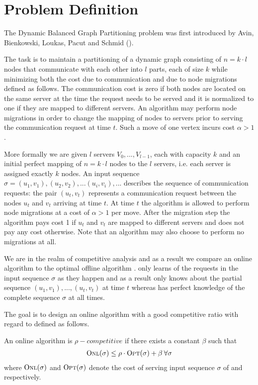 \documentclass[a4paper,xcolor=dvipsnames, tikz, 12pt]{article}
\newcommand{\opt}{\text{O{\scriptsize PT}}}
\newcommand{\onl}{\text{O{\scriptsize NL}}}
\theoremstyle{definition}
\begin{document}
	
	\section{Problem Definition}
	
	The Dynamic Balanced Graph Partitioning problem was first introduced by Avin, Bienkowski, Loukas, Pacut and Schmid (\cite{Avin2015}).
	
	The task is to maintain a partitioning of a dynamic graph consisting of $n=k\cdot l$ nodes that communicate with each other into $l$ parts, each of size $k$ while minimizing both the cost due to communication and due to node migrations defined as follows. The communication cost is zero if both nodes are located on the same server at the time the request needs to be served and it is normalized to one if they are mapped to different servers. An algorithm may perform node migrations in order to change the mapping of nodes to servers prior to serving the communication request at time $t$. Such a move of one vertex incurs cost $\alpha>1$.
	
	More formally we are given $l$ servers $V_0,...,V_{l-1}$, each with capacity $k$ and an initial perfect mapping of $n=k\cdot l$ nodes to the $l$ servers, i.e. each server is assigned exactly $k$ nodes. An input sequence $\sigma=(u_1, v_1), (u_2, v_2),...(u_i,v_i),...$ describes the sequence of communication requests: the pair $(u_t, v_t)$ represents a communication request between the nodes $u_t$ and $v_t$ arriving at time $t$. At time $t$ the algorithm is allowed to perform node migrations at a cost of $\alpha>1$ per move. After the migration step the algorithm pays cost 1 if $u_t$ and $v_t$ are mapped to different servers and does not pay any cost otherwise. Note that an algorithm may also choose to perform no migrations at all.
	
	We are in the realm of competitive analysis and as a result we compare an online algorithm \onl{} to the optimal offline algorithm \opt{}. \onl{} only learns of the requests in the input sequence $\sigma$ as they happen and as a result only knows about the partial sequence $(u_1,v_1),...,(u_t,v_t)$ at time $t$ whereas \opt{} has perfect knowledge of the complete sequence $\sigma$ at all times.
	
	The goal is to design an online algorithm \onl{} with a good competitive ratio with regard to \opt{} defined as follows.
	
	An online algorithm \onl{} is $\rho-competitive$ if there exists a constant $\beta$ such that 
	\begin{align*}
	\onl{}(\sigma)\leq\rho\cdot \opt{}(\sigma)+\beta\:\forall \sigma
	\end{align*} 
	where $\onl{}(\sigma)$ and $\opt{}(\sigma)$ denote the cost of serving input sequence $\sigma$ of \onl{} and \opt{} respectively.
	
\end{document}
